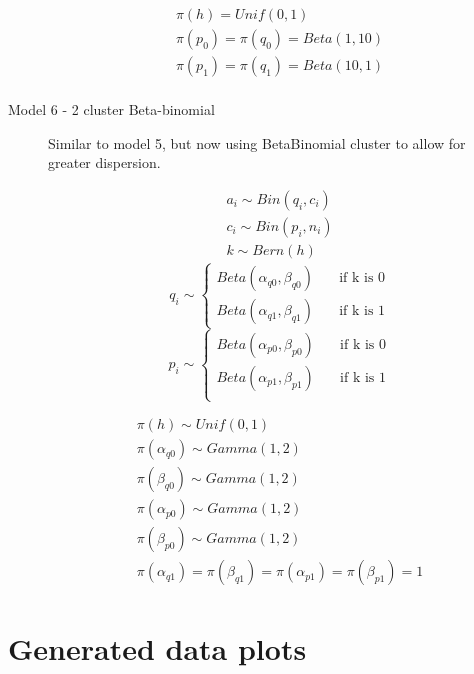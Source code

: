 \documentclass[11pt,a4,singlespacing,titlepagenumber=on]{scrreprt}
\numberwithin{equation}{chapter} %
\theoremstyle{remark}
\begin{document}
\begin{description}
 \begin{align}
	\pi(h) = Unif(0,1) \\
	\pi(p_0) = \pi(q_0) = Beta(1,10) \\
	\pi(p_1) = \pi(q_1) = Beta(10,1) \\
\end{align}


	\item[Model 6 - 2 cluster Beta-binomial]

Similar to model 5, but now using BetaBinomial cluster to allow for greater dispersion.

 \begin{align}
	a_i \sim Bin(q_i,c_i) \\
	c_i \sim Bin(p_i,n_i) \\
	k \sim Bern(h) 
\end{align}
	\[ 
	q_i \sim 
  	\begin{cases}
		Beta(\alpha_{q0},\beta_{q0}) & \quad \text{if k is 0}\\
		Beta(\alpha_{q1},\beta_{q1}) & \quad \text{if k is 1}
	\end{cases}
	\]
	\[
	p_i \sim 
  	\begin{cases}
		Beta(\alpha_{p0},\beta_{p0}) & \quad \text{if k is 0}\\
		Beta(\alpha_{p1},\beta_{p1}) & \quad \text{if k is 1}\\
	\end{cases}
	\]

 \begin{align}
	\pi(h) \sim Unif(0,1) \\
	\pi(\alpha_{q0}) \sim Gamma(1,2) \\
	\pi(\beta_{q0}) \sim Gamma(1,2) \\
	\pi(\alpha_{p0}) \sim Gamma(1,2) \\
	\pi(\beta_{p0}) \sim Gamma(1,2) \\
	\pi(\alpha_{q1}) = \pi(\beta_{q1}) = \pi(\alpha_{p1}) = \pi(\beta_{p1}) = 1
\end{align}


%
%
\end{description}


\section{Generated data plots}
\end{document}

